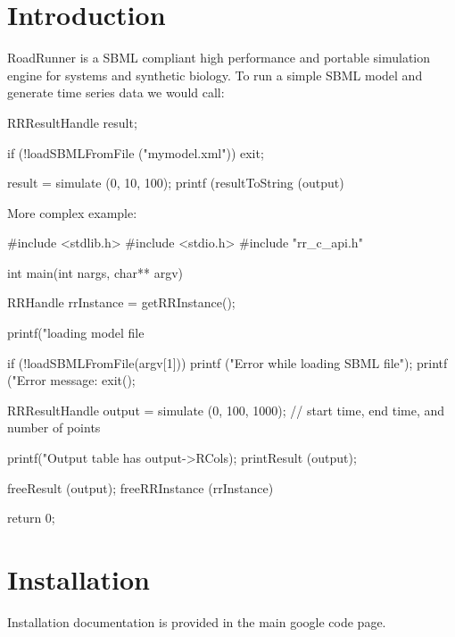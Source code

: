 \hypertarget{index_intro_sec}{}\section{\-Introduction}\label{index_intro_sec}
\-Road\-Runner is a \-S\-B\-M\-L compliant high performance and portable simulation engine for systems and synthetic biology. \-To run a simple \-S\-B\-M\-L model and generate time series data we would call\-:


\begin{DoxyCode}
 RRResultHandle result;

 if (!loadSBMLFromFile ("mymodel.xml"))
    exit;

 result = simulate (0, 10, 100);
 printf (resultToString (output)
\end{DoxyCode}


\-More complex example\-:


\begin{DoxyCode}
 #include <stdlib.h>
 #include <stdio.h>
 #include "rr_c_api.h"

 int main(int nargs, char** argv)
 {
        RRHandle rrInstance = getRRInstance();

        printf("loading model file %
 
        if (!loadSBMLFromFile(argv[1])) {
           printf ("Error while loading SBML file\n");
           printf ("Error message: %
           exit();
        }
                   
        RRResultHandle output = simulate (0, 100, 1000);  // start time, end
       time, and number of points
        
        printf("Output table has %
      output->RCols);
        printResult (output);

        freeResult (output);
        freeRRInstance (rrInstance)

        return 0;
 }
\end{DoxyCode}
 \hypertarget{index_install_sec}{}\section{\-Installation}\label{index_install_sec}
\-Installation documentation is provided in the main google code page. 